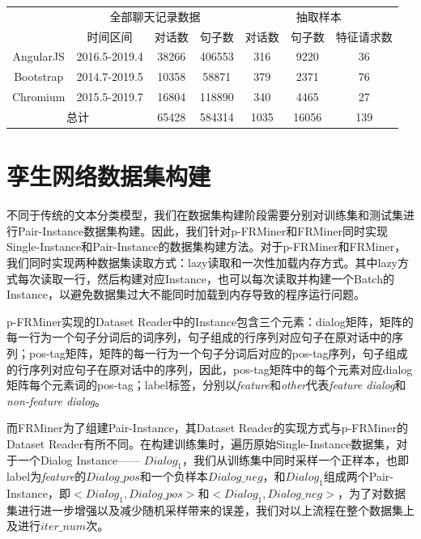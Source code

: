 \begin{table}[htbp]
    \label{tab:dataset}
    \centering
    \footnotesize%
    \setlength{\tabcolsep}{4pt}%
    \renewcommand{\arraystretch}{1.2}%
\begin{tabular}{|c|c|c|c|c|c|c|}
\hline
\multirow{}{}{} & \multicolumn{3}{c|}{全部聊天记录数据}    & \multicolumn{3}{c|}{抽取样本} \\ \cline{2-7} 
                  & 时间区间          & 对话数   & 句子数    & 对话数    & 句子数     & 特征请求数  \\ \hline
AngularJS         & 2016.5-2019.4 & 38266 & 406553 & 316    & 9220    & 36     \\ \hline
Bootstrap         & 2014.7-2019.5 & 10358 & 58871  & 379    & 2371    & 76     \\ \hline
Chromium          & 2015.5-2019.7 & 16804 & 118890 & 340    & 4465    & 27     \\ \hline
\multicolumn{2}{|c|}{总计}          & 65428 & 584314 & 1035   & 16056   & 139    \\ \hline
\end{tabular}
\end{table}
\section{孪生网络数据集构建}
不同于传统的文本分类模型，我们在数据集构建阶段需要分别对训练集和测试集进行Pair-Instance数据集构建。因此，我们针对p-FRMiner和FRMiner同时实现Single-Instance和Pair-Instance的数据集构建方法。对于p-FRMiner和FRMiner，我们同时实现两种数据集读取方式：lazy读取和一次性加载内存方式。其中lazy方式每次读取一行，然后构建对应Instance，也可以每次读取并构建一个Batch的Instance，以避免数据集过大不能同时加载到内存导致的程序运行问题。

p-FRMiner实现的Dataset Reader中的Instance包含三个元素：dialog矩阵，矩阵的每一行为一个句子分词后的词序列，句子组成的行序列对应句子在原对话中的序列；pos-tag矩阵，矩阵的每一行为一个句子分词后对应的pos-tag序列，句子组成的行序列对应句子在原对话中的序列，因此，pos-tag矩阵中的每个元素对应dialog矩阵每个元素词的pos-tag；label标签，分别以\textit{feature}和\textit{other}代表\textit{feature dialog}和\textit{non-feature dialog}。

而FRMiner为了组建Pair-Instance，其Dataset Reader的实现方式与p-FRMiner的Dataset Reader有所不同。在构建训练集时，遍历原始Single-Instance数据集，对于一个Dialog Instance—— $Dialog_1$，我们从训练集中同时采样一个正样本，也即label为\textit{feature}的$Dialog\_pos$和一个负样本$Dialog\_neg$，和$Dialog_1$组成两个Pair-Instance，即$<Dialog_1,Dialog\_pos>$和$<Dialog_1,Dialog\_neg>$，为了对数据集进行进一步增强以及减少随机采样带来的误差，我们对以上流程在整个数据集上及进行$iter\_num$次。





